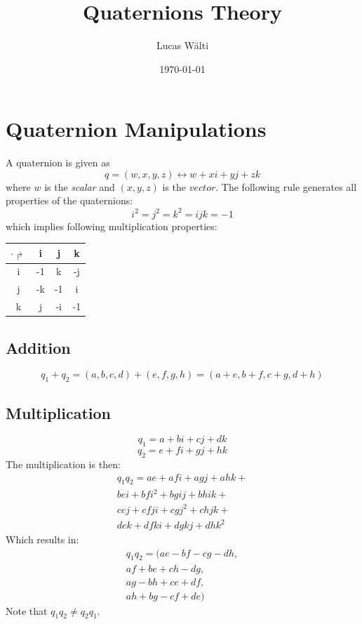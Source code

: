 \documentclass[10pt,a4paper]{article}
\title{Quaternions Theory}
\author{Lucas Wälti}
\date{\today}
\begin{document}
\maketitle
\thispagestyle{empty}	%
\large
\section{Quaternion Manipulations}
A quaternion is given as
$$
q = (w,x,y,z) \longleftrightarrow  w + xi + yj +zk
$$
where $w$ is the \emph{scalar} and $(x,y,z)$ is the $vector$. 
The following rule generates all properties of the quaternions: 
$$
\boxed{
i^2 = j^2 = k^2 = ijk = -1
}
$$
which implies following multiplication properties: 
\begin{center}
\begin{tabular}{c|ccc}
$\cdot\Rsh$ & i & j & k \\ 
\hline 
i & -1 & k & -j \\ 
j & -k & -1 & i \\ 
k & j & -i & -1 \\ 
\end{tabular} 
\end{center}

\subsection{Addition}
$$
q_1 + q_2 = (a,b,c,d) + (e,f,g,h) = (a+e,b+f,c+g,d+h)
$$
\subsection{Multiplication}
$$
q_1 = a + bi +cj + dk
$$
$$
q_2 = e + fi + gj + hk
$$
The multiplication is then:
\begin{equation*}
\begin{split}
q_1q_2 =  ae + afi + agj + ahk +\\ 
bei + bfi^2 + bgij + bhik +\\
cej + cfji + cgj^2 + chjk +\\
dek + dfki + dgkj + dhk^2 
\end{split}
\end{equation*}
Which results in:
\begin{equation*}
\boxed{
\begin{split}
q_1q_2 = (ae - bf - cg - dh, \\
af + be + ch - dg, \\
ag - bh + ce + df, \\
ah + bg - cf + de)
\end{split}
}
\end{equation*}
Note that $q_1q_2 \neq q_2q_1$. 
\end{document}
